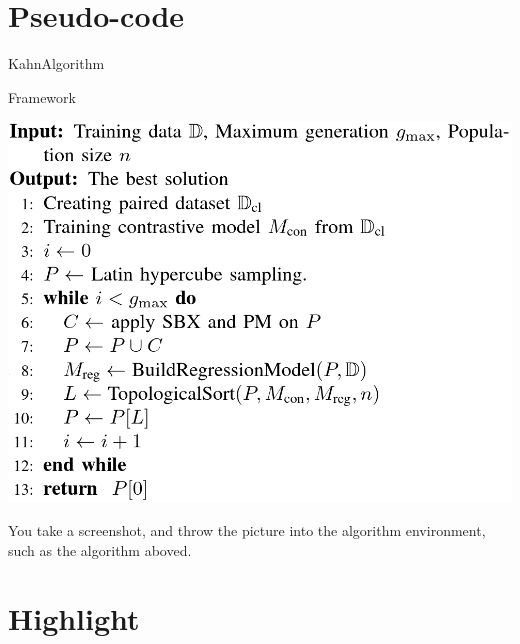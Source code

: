 \documentclass[
    UTF8
]{report}
\begin{document}
\section{Pseudo-code}
\begin{center}
    \begin{minipage}{0.55\textwidth}
        \begin{algorithm}[H]
            \centering
            \caption{KahnAlgorithm}
            \label{algo:kaha}
            
        \end{algorithm}
    \end{minipage}
\end{center}

\begin{center}
    \begin{minipage}{0.55\textwidth}
        \begin{algorithm}[H]
            \scriptsize
            \caption{Framework}
            \label{aglo:figure}
            \includegraphics[width=\textwidth]{./algo/figure.png}
        \end{algorithm}
    \end{minipage}
\end{center}
You take a screenshot, and throw the picture into the algorithm environment, such as the algorithm aboved.

\section{Highlight}

\inputminted[linenos]{cpp}{./code/quicksort.cpp}
\end{document}
